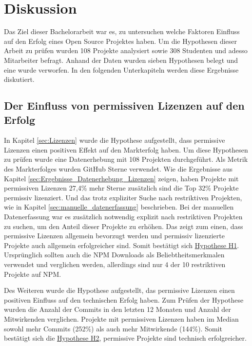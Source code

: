 \chapter{Diskussion}


Das Ziel dieser Bachelorarbeit war es, zu untersuchen welche Faktoren Einfluss auf den Erfolg
eines Open Source Projektes haben. Um die Hypothesen dieser Arbeit zu prüfen wurden 108 Projekte
analysiert sowie 308 Studenten und adesso Mitarbeiter befragt.
Anhand der Daten wurden sieben Hypothesen belegt und eine wurde verworfen.
In den folgenden Unterkapiteln werden diese Ergebnisse diskutiert.



\section{Der Einfluss von permissiven Lizenzen auf den Erfolg}


In Kapitel \ref{sec:Lizenzen} wurde die Hypothese aufgestellt, dass permissive Lizenzen einen positiven
Effekt auf den Markterfolg haben.
Um diese Hypothesen zu prüfen wurde eine Datenerhebung mit 108 Projekten durchgeführt. Als Metrik des
Markterfolges wurden GitHub Sterne verwendet.
Wie die Ergebnisse aus Kapitel \ref{sec:Ergebnisse_Datenerhebung_Lizenzen} zeigen, haben Projekte mit
permissiven Lizenzen 27,4\% mehr Sterne zusätzlich sind die Top 32\% Projekte permissiv lizenziert.
Und das trotz expliziter Suche nach restriktiven Projekten, wie in Kapitel \ref{sec:manuelle_datenerfassung}
beschrieben. Bei der manuellen Datenerfassung war es zusätzlich notwendig explizit nach restriktiven
Projekten zu suchen, um den Anteil dieser Projekte zu erhöhen. Das zeigt zum einen, dass
permissive Lizenzen allgemein bevorzugt werden und permissiv lizenzierte Projekte auch allgemein
erfolgreicher sind. Somit bestätigt sich \hyperref[H:1]{Hypothese H1}.
Ursprünglich sollten auch die NPM Downloads als Beliebtheitsmerkmalen verwendet und verglichen
werden, allerdings sind nur 4 der 10 restriktiven Projekte auf NPM.


\bigskip
\noindent
Des Weiteren wurde die Hypothese aufgestellt, das permissive Lizenzen einen positiven Einfluss auf den
technischen Erfolg haben.
Zum Prüfen der Hypothese wurden die Anzahl der Commits in den letzten 12 Monaten und Anzahl der Mitwirkenden
verglichen.
Projekte mit permissiven Lizenzen haben im Median sowohl mehr Commits (252\%) als auch mehr Mitwirkende
(144\%). Somit bestätigt sich die \hyperref[H:2]{Hypothese H2}, permissive Projekte sind technisch
erfolgreicher.


